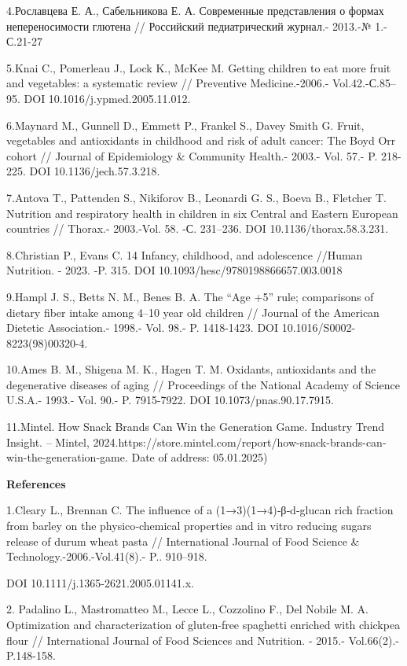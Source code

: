 {4.Рославцева Е. А., Сабельникова Е. А. Современные представления о
формах непереносимости глютена // Российский педиатрический журнал.-
2013.-№ 1.- С.21-27

5.Knai C., Pomerleau J., Lock K., McKee M. Getting children to eat more
fruit and vegetables: a systematic review // Preventive Medicine.-2006.-
Vol.42.-С.85--95. DOI 10.1016/j.ypmed.2005.11.012.

6.Maynard M., Gunnell D., Emmett P., Frankel S., Davey Smith G. Fruit,
vegetables and antioxidants in childhood and risk of adult cancer: The
Boyd Orr cohort // Journal of Epidemiology \& Community Health.- 2003.-
Vol. 57.- P. 218-225. DOI 10.1136/jech.57.3.218.

7.Antova T., Pattenden S., Nikiforov B., Leonardi G. S., Boeva B.,
Fletcher T. Nutrition and respiratory health in children in six Central
and Eastern European countries // Thorax.- 2003.-Vol. 58. -С. 231--236.
DOI 10.1136/thorax.58.3.231.

8.Christian P., Evans C. 14 Infancy, childhood, and adolescence //Human
Nutrition. - 2023. -P. 315. DOI 10.1093/hesc/9780198866657.003.0018

9.Hampl J. S., Betts N. M., Benes B. A. The ``Age +5'' rule; comparisons
of dietary fiber intake among 4--10 year old children // Journal of the
American Dietetic Association.- 1998.- Vol. 98.- P. 1418-1423. DOI
10.1016/S0002-8223(98)00320-4.

10.Ames B. M., Shigena M. K., Hagen T. M. Oxidants, antioxidants and the
degenerative diseases of aging // Proceedings of the National Academy of
Science U.S.A.- 1993.- Vol. 90.- P. 7915-7922. DOI
10.1073/pnas.90.17.7915.

11.Mintel. How Snack Brands Can Win the Generation Game. Industry Trend
Insight. -- Mintel,
2024.https://store.mintel.com/report/how-snack-brands-can-win-the-generation-game.
Date of address: 05.01.2025)

{\bfseries References}

1.Cleary L., Brennan C. The influence of a (1→3)(1→4)‐β‐d‐glucan rich
fraction from barley on the physico‐chemical properties and in vitro
reducing sugars release of durum wheat pasta // International Journal of
Food Science \& Technology.-2006.-Vol.41(8).- P.. 910--918.

DOI 10.1111/j.1365-2621.2005.01141.x.

2. Padalino L., Mastromatteo M., Lecce L., Cozzolino F., Del Nobile M.
A. Optimization and characterization of gluten-free spaghetti enriched
with chickpea flour // International Journal of Food Sciences and
Nutrition. - 2015.- Vol.66(2).- P.148-158.

}
